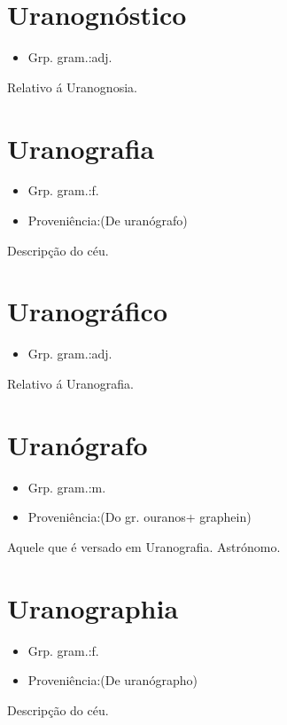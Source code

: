 \documentclass{article}
\begin{document}
\section{Uranognóstico}
\begin{itemize}
\item {Grp. gram.:adj.}
\end{itemize}
Relativo á Uranognosia.
\section{Uranografia}
\begin{itemize}
\item {Grp. gram.:f.}
\end{itemize}
\begin{itemize}
\item {Proveniência:(De \textunderscore uranógrafo\textunderscore )}
\end{itemize}
Descripção do céu.
\section{Uranográfico}
\begin{itemize}
\item {Grp. gram.:adj.}
\end{itemize}
Relativo á Uranografia.
\section{Uranógrafo}
\begin{itemize}
\item {Grp. gram.:m.}
\end{itemize}
\begin{itemize}
\item {Proveniência:(Do gr. \textunderscore ouranos\textunderscore  + \textunderscore graphein\textunderscore )}
\end{itemize}
Aquele que é versado em Uranografia.
Astrónomo.
\section{Uranographia}
\begin{itemize}
\item {Grp. gram.:f.}
\end{itemize}
\begin{itemize}
\item {Proveniência:(De \textunderscore uranógrapho\textunderscore )}
\end{itemize}
Descripção do céu.
\end{document}
